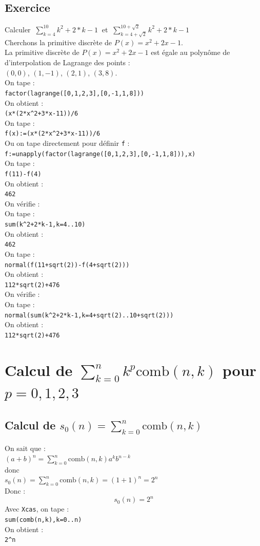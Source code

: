 \documentclass[a4paper,11pt]{book}
\begin{document}
\subsection{Exercice}
Calculer $\displaystyle\  \sum_{k=4}^{10}k^2+2*k-1\ $
et $\displaystyle \ \sum_{k=4+\sqrt 2}^{10+\sqrt 2}k^2+2*k-1$\\
Cherchons la primitive discr\`ete de $P(x)=x^2+2x-1$.\\
La primitive discr\`ete de $P(x)=x^2+2x-1$ est \'egale au polyn\^ome de 
d'interpolation de Lagrange des points :\\
$(0,0)$, $(1,-1)$, $(2,1)$, $(3,8)$.\\
On tape :\\
{\tt factor(lagrange([0,1,2,3],[0,-1,1,8]))}\\
On obtient :\\
{\tt (x*(2*x\verb|^|2+3*x-11))/6}\\
On tape :\\
{\tt f(x):=(x*(2*x\verb|^|2+3*x-11))/6}\\
Ou on tape directement pour d\'efinir {\tt f} :\\
{\tt f:=unapply(factor(lagrange([0,1,2,3],[0,-1,1,8])),x)}\\
On tape :\\
{\tt f(11)-f(4)}\\
On obtient :\\
{\tt 462}\\
On v\'erifie :\\
On tape :\\
{\tt sum(k\verb|^|2+2*k-1,k=4..10)}\\
On obtient :\\
{\tt 462}\\
On tape :\\
{\tt normal(f(11+sqrt(2))-f(4+sqrt(2)))}\\
On obtient :\\
{\tt 112*sqrt(2)+476}\\
On v\'erifie :\\
On tape :\\
{\tt normal(sum(k\verb|^|2+2*k-1,k=4+sqrt(2)..10+sqrt(2)))}\\
On obtient :\\
{\tt 112*sqrt(2)+476}

\section{Calcul de $\sum_{k=0}^nk^p\mbox{comb}(n,k)$ pour $p=0,1,2,3$}
\subsection{Calcul de $s_0(n)=\sum_{k=0}^n\mbox{comb}(n,k)$}
On sait que :\\
$(a+b)^n=\sum_{k=0}^n\mbox{comb}(n,k)a^kb^{n-k}$ \\
donc\\
$s_0(n)=\sum_{k=0}^n\mbox{comb}(n,k)=(1+1)^n=2^n$\\
Donc :
$$s_0(n)=2^n$$
Avec {\tt Xcas}, on tape :\\
{\tt sum(comb(n,k),k=0..n)}\\
On obtient :\\
{\tt  2\verb|^|n}
\end{document}
